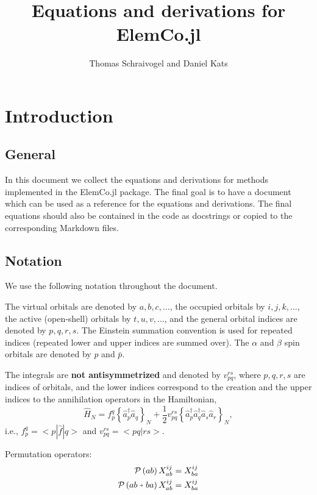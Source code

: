 \documentclass[a4paper,12pt,oneside]{book}
\newcommand{\veryshortarrow}[1][3pt]{\mathrel{%
   \hbox{\rule[\dimexpr\fontdimen22\textfont2-.2pt\relax]{#1}{.4pt}}%
   \mkern-4mu\hbox{\usefont{U}{lasy}{m}{n}\symbol{41}}}}
\newcommand{\op}{\hat}
\newcommand{\perm}[1]{{\cal P}\left(#1\right)}
\newcommand{\Perm}[2]{{\cal P}\left({#1}\veryshortarrow {#2}\right)}
\newcommand{\spa}[1]{{#1}}
\newcommand{\spb}[1]{\bar{#1}}
\newcommand{\ElemCojl}{\textsf{ElemCo.jl} }
\begin{document}
\title{Equations and derivations for \ElemCojl}
\author{Thomas Schraivogel and Daniel Kats}
\maketitle
\tableofcontents
\chapter{Introduction}
\section{General}
In this document we collect the equations and derivations for methods implemented in the \ElemCojl package.
The final goal is to have a document which can be used as a reference for the equations and derivations.
The final equations should also be contained in the code as docstrings or copied to the corresponding Markdown files.

\section{Notation}

We use the following notation throughout the document.

The virtual orbitals are denoted by $a,b,c,\ldots$, the occupied orbitals by $i,j,k,\ldots$,
the active (open-shell) orbitals by $t,u,v,\ldots$,
and the general orbital indices are denoted by $p,q,r,s$.
The Einstein summation convention is used for repeated indices (repeated lower and upper indices are summed over).
The $\alpha$ and $\beta$ spin orbitals are denoted by $\spa{p}$ and $\spb{p}$.

The integrals are \textbf{not antisymmetrized} and denoted by $v_{pq}^{rs}$, where $p,q,r,s$ are indices of orbitals,
and the lower indices correspond to the creation and the upper indices to the annihilation operators in the Hamiltonian,
\begin{equation}
  \op H_N = f_p^q \left\{\op a^\dagger_p \op a_q\right\}_N + 
  \frac{1}{2} v_{pq}^{rs} \left\{\op a^\dagger_p \op a^\dagger_q \op a_s \op a_r\right\}_N,
\end{equation}
i.e., $f_p^q = <p|\op f|q>$ and $v_{pq}^{rs} = <pq|rs>$.

Permutation operators:
\begin{equation}
\begin{aligned}
\perm{ab} X^{ij}_{ab} &= X^{ij}_{ba} \\
\Perm{ab}{ba} X^{ij}_{ab} &= X^{ij}_{ba} \\
\end{aligned}
\end{equation}
\end{document}
